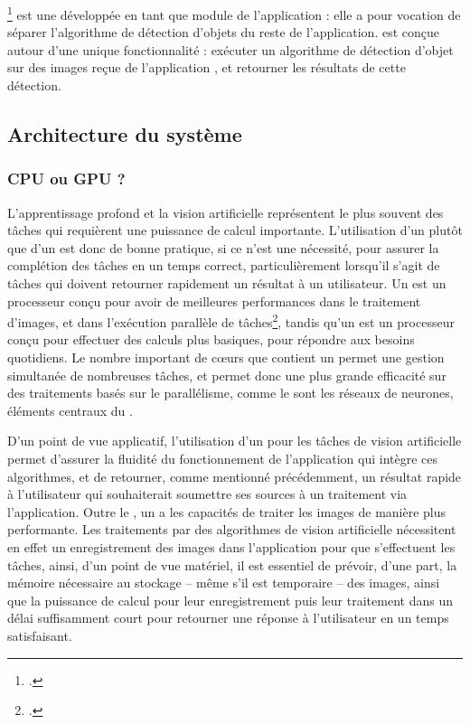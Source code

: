 
\exapi\footcite{norindrElementExtractionGPU2023} est une \api développée en tant que module de l'application \eida : elle a pour vocation de séparer l'algorithme de détection d'objets du reste de l'application. \exapi est conçue autour d'une unique fonctionnalité : exécuter un algorithme de détection d'objet sur des images reçue de l'application \eida, et retourner les résultats de cette détection.

\subsection{Architecture du système}
    \subsubsection{CPU ou GPU ?}
	L'apprentissage profond et la vision artificielle représentent le plus souvent des tâches qui requièrent une puissance de calcul importante. L'utilisation d'un \gpu plutôt que d'un \cpu est donc de bonne pratique, si ce n'est une nécessité, pour assurer la complétion des tâches en un temps correct, particulièrement lorsqu'il s'agit de tâches qui doivent retourner rapidement un résultat à un utilisateur. Un \gpu est un processeur conçu pour avoir de meilleures performances dans le traitement d'images, et dans l'exécution parallèle de tâches\footcite{sharabokWhyDeepLearning2020}, tandis qu'un \cpu est un processeur conçu pour effectuer des calculs plus basiques, pour répondre aux besoins quotidiens. Le nombre important de cœurs que contient un \gpu permet une gestion simultanée de nombreuses tâches, et permet donc une plus grande efficacité sur des traitements basés sur le parallélisme, comme le sont les réseaux de neurones, éléments centraux du \dl.
	
	D'un point de vue applicatif, l'utilisation d'un \gpu pour les tâches de vision artificielle permet d'assurer la fluidité du fonctionnement de l'application qui intègre ces algorithmes, et de retourner, comme mentionné précédemment, un résultat rapide à l'utilisateur qui souhaiterait soumettre ses sources à un traitement via l'application. Outre le \ml, un \gpu a les capacités de traiter les images de manière plus performante. Les traitements par des algorithmes de vision artificielle nécessitent en effet un enregistrement des images dans l'application pour que s'effectuent les tâches, ainsi, d'un point de vue matériel, il est essentiel de prévoir, d'une part, la mémoire nécessaire au stockage -- même s'il est temporaire -- des images, ainsi que la puissance de calcul pour leur enregistrement puis leur traitement dans un délai suffisamment court pour retourner une réponse à l'utilisateur en un temps satisfaisant. 
    
